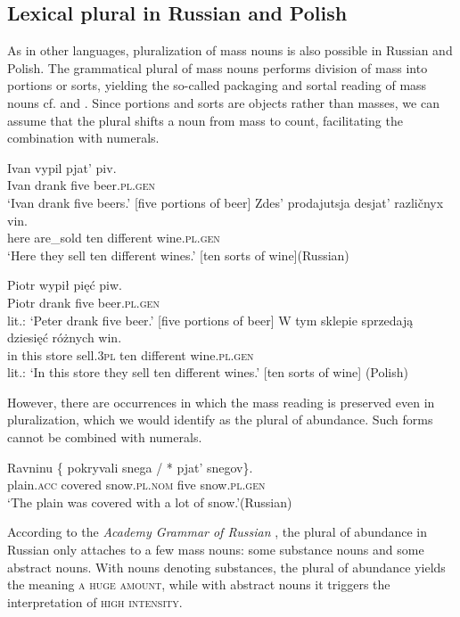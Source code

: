 \documentclass[output=paper,colorlinks,citecolor=brown,
]{langscibook}
\newcommand{\minsp}[1]{#1\hspace{-2pt}} %
\begin{document}

\subsection{Lexical plural in Russian and Polish}\label{sec:4.3}

As in other languages, pluralization of mass nouns is also possible in Russian and Polish. The grammatical plural of mass nouns performs division of mass into portions or sorts, yielding the so-called packaging and sortal reading of mass nouns cf.  and . Since portions and sorts are objects rather than masses, we can assume that the plural shifts a noun from mass to count, facilitating the combination with numerals. 

\ea\label{ex:38}
\ea\gll Ivan vypil pjat' piv.  \\	
Ivan drank five beer.\textsc{pl.gen} \\ 
\glt `Ivan drank five beers.' [five portions of beer]\label{ex:38a}
\ex\gll Zdes' prodajutsja desjat' različnyx vin. \\
here are\_sold ten different wine.\textsc{pl.gen} \\
\glt `Here they sell ten different wines.' [ten sorts of wine]\hfill (Russian)\label{ex:38b}
\z\z

\ea\label{ex:39} 
\ea\gll Piotr wypił pięć piw. \\
Piotr drank five beer.\textsc{pl.gen} \\ 
\glt lit.: `Peter drank five beer.' [five portions of beer]
\label{ex:39a}
\ex\gll W tym sklepie sprzedają dziesięć różnych win. \\
in this store sell.\textsc{3pl} ten different wine.\textsc{pl.gen} \\
\glt lit.: `In this store they sell ten different wines.' [ten sorts of wine] 
\label{ex:39b}
\z\hfill (Polish)\z
   			
\noindent However, there are occurrences in which the mass reading is preserved even in pluralization, which we would identify as the plural of abundance. Such forms cannot be combined with numerals. 

\ea\gll Ravninu \minsp{\{} pokryvali snega / \minsp{*} pjat' snegov\}. \\
plain.\textsc{acc} {} covered snow.\textsc{pl.nom} {} {} five snow.\textsc{pl.gen} \\  
\glt `The plain was covered with a lot of snow.'\hfill (Russian)
\z

\noindent According to the \textit{Academy Grammar of Russian} \citep{Svedova1980}, the plural of abundance in Russian only attaches to a few mass nouns: some substance nouns and some abstract nouns. With nouns denoting substances, the plural of abundance yields the meaning \textsc{a huge amount}, while with abstract nouns it triggers the interpretation of \textsc{high intensity}.
\end{document}
